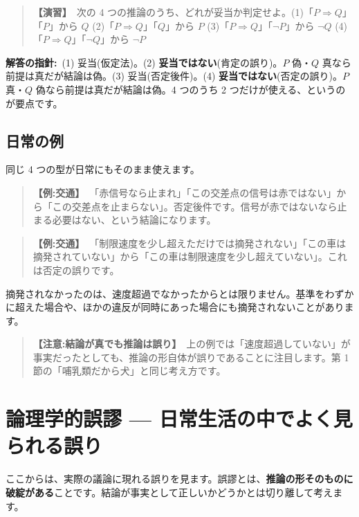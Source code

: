 \documentclass{article}
\begin{document}
\begin{quote}
\textbf{【演習】}\ 次の 4 つの推論のうち、どれが妥当か判定せよ。(1)「\(P \Rightarrow Q\)」「\(P\)」から \(Q\) (2)「\(P \Rightarrow Q\)」「\(Q\)」から \(P\) (3)「\(P \Rightarrow Q\)」「\(\neg P\)」から \(\neg Q\) (4)「\(P \Rightarrow Q\)」「\(\neg Q\)」から \(\neg P\)
\end{quote}

\textbf{解答の指針:}\ (1) 妥当(仮定法)。(2) \textbf{妥当ではない}(肯定の誤り)。\(P\) 偽・\(Q\) 真なら前提は真だが結論は偽。(3) 妥当(否定後件)。(4) \textbf{妥当ではない}(否定の誤り)。\(P\) 真・\(Q\) 偽なら前提は真だが結論は偽。4 つのうち 2 つだけが使える、というのが要点です。

\subsection{日常の例}

同じ 4 つの型が日常にもそのまま使えます。

\begin{quote}
\textbf{【例:交通】}\ 「赤信号なら止まれ」「この交差点の信号は赤ではない」から「この交差点を止まらない」。否定後件です。信号が赤ではないなら止まる必要はない、という結論になります。
\end{quote}

\begin{quote}
\textbf{【例:交通】}\ 「制限速度を少し超えただけでは摘発されない」「この車は摘発されていない」から「この車は制限速度を少し超えていない」。これは否定の誤りです。
\end{quote}

摘発されなかったのは、速度超過でなかったからとは限りません。基準をわずかに超えた場合や、ほかの違反が同時にあった場合にも摘発されないことがあります。

\begin{quote}
\textbf{【注意:結論が真でも推論は誤り】}\ 上の例では「速度超過していない」が事実だったとしても、推論の形自体が誤りであることに注目します。第 1 節の「哺乳類だから犬」と同じ考え方です。
\end{quote}

\section{論理学的誤謬 — 日常生活の中でよく見られる誤り}

ここからは、実際の議論に現れる誤りを見ます。誤謬とは、\textbf{推論の形そのものに破綻がある}ことです。結論が事実として正しいかどうかとは切り離して考えます。
\end{document}

